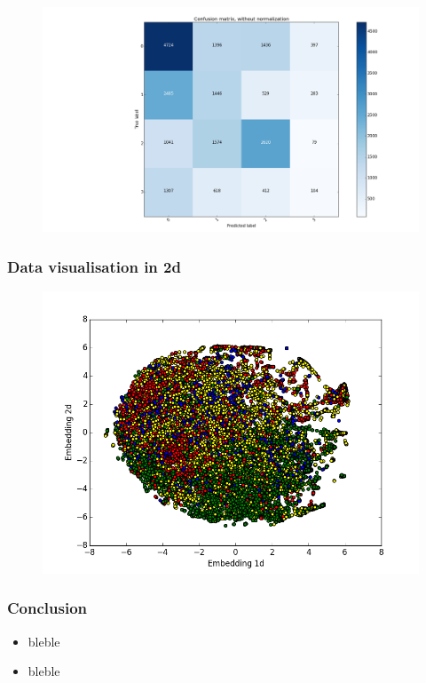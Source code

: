 \documentclass{beamer}
\begin{document}
\begin{frame}
\begin{figure}
\begin{minipage}[b]{0.5\linewidth}
    \vspace{2ex}
  \end{minipage}%
  \begin{minipage}[b]{0.5\linewidth}
    \centering
    \includegraphics[width=1\linewidth]{../REPORT/cosSimConfMat2.png} 
    \vspace{2ex}
  \end{minipage} 
\end{figure}
\end{frame}


\begin{frame}
\frametitle{Data visualisation in 2d}
\begin{figure}
\includegraphics[width=0.8\linewidth]{../REPORT/embedding2DTrue_labelsColor2.png}  
\end{figure}
\end{frame}


\begin{frame}
\frametitle{Conclusion}
\begin{itemize} 
\item bleble
\item bleble
\end{itemize}
\end{frame}



 
 
 
\end{document}
